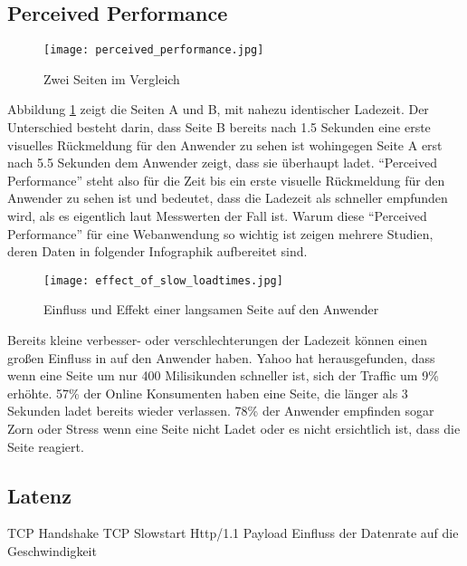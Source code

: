 		\pagebreak
	

	\subsection{Perceived Performance} %
	\label{sub:perceived_performance}
		\begin{figure}[htbp]
			\begin{center}
				\texttt{[image: perceived\_performance.jpg]}
				\caption{Zwei Seiten im Vergleich}
				\label{fig:perceived_performance}
			\end{center}
		\end{figure}

		Abbildung \ref{fig:perceived_performance} zeigt die Seiten A und B, mit nahezu identischer Ladezeit. Der Unterschied besteht darin, dass Seite B bereits nach 1.5 Sekunden eine erste visuelles Rückmeldung für den Anwender zu sehen ist wohingegen Seite A erst nach 5.5 Sekunden dem Anwender zeigt, dass sie überhaupt ladet.
		"`Perceived Performance"' steht also für die Zeit bis ein erste visuelle Rückmeldung für den Anwender zu sehen ist und bedeutet, dass die Ladezeit als schneller empfunden wird, als es eigentlich laut Messwerten der Fall ist. Warum diese "`Perceived Performance"' für eine Webanwendung so wichtig ist zeigen mehrere Studien, deren Daten in folgender Infographik aufbereitet sind.

		\begin{figure}[htbp]
			\begin{center}
				\texttt{[image: effect\_of\_slow\_loadtimes.jpg]}
				\caption{Einfluss und Effekt einer langsamen Seite auf den Anwender \autocite[p. 8]{radware14}\autocite{nng93}}
				\label{fig:effect_of_slow_loadtimes}
			\end{center}
		\end{figure}

		Bereits kleine verbesser- oder verschlechterungen der Ladezeit können einen großen Einfluss in auf den Anwender haben. Yahoo hat herausgefunden, dass wenn eine Seite um nur 400 Milisikunden schneller ist, sich der Traffic um 9\% erhöhte.\autocite{stefanov08} 57\% der Online Konsumenten haben eine Seite, die länger als 3 Sekunden ladet bereits wieder verlassen. 78\% der Anwender empfinden sogar Zorn oder Stress wenn eine Seite nicht Ladet oder es nicht ersichtlich ist, dass die Seite reagiert.


	\subsection{Latenz}
	\label{sub:latenz}
		TCP Handshake
		TCP Slowstart
		Http/1.1
		Payload
		Einfluss der Datenrate auf die Geschwindigkeit

		

	
